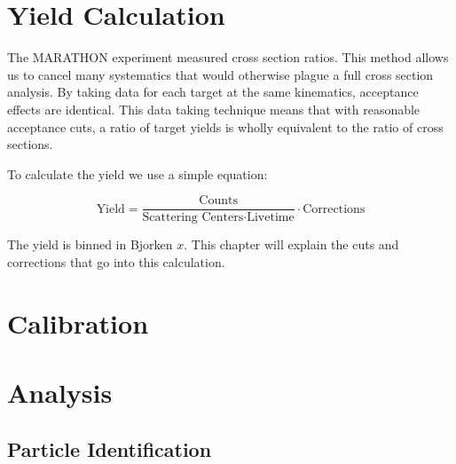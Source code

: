 \section{Yield Calculation}

The MARATHON experiment measured cross section ratios. This method allows us to cancel many systematics that would otherwise plague a full cross section analysis. By taking data for each target at the same kinematics, acceptance effects are identical. This data taking technique means that with reasonable acceptance cuts, a ratio of target yields is wholly equivalent to the ratio of cross sections.

To calculate the yield we use a simple equation:

\begin{equation}
	\text{Yield} = \frac{\text{Counts}}{\text{Scattering Centers} \cdot \text{Livetime}} \cdot \text{Corrections}
\end{equation}

The yield is binned in Bjorken $x$. This chapter will explain the cuts and corrections that go into this calculation.

\section{Calibration}


\section{Analysis}

\subsection{Particle Identification}
